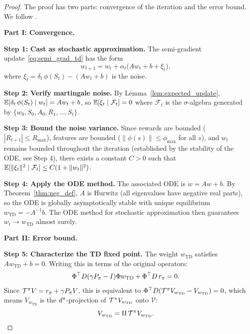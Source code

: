 \documentclass[11pt,a4paper]{article}
\begin{document}
\begin{proof}
The proof has two parts: convergence of the iteration and the error
bound. We follow \citet{tsitsiklis1997}.

\textbf{Part I: Convergence.}

\textbf{Step 1: Cast as stochastic approximation.}
The semi-gradient update~\eqref{eq:semi_grad_td} has the form
\begin{equation}
  w_{t+1} = w_t + \alpha_t\bigl(Aw_t + b + \xi_t\bigr),
  \label{eq:sa_form}
\end{equation}
where $\xi_t = \delta_t\,\phi(S_t) - (Aw_t + b)$ is the noise.

\textbf{Step 2: Verify martingale noise.}
By Lemma~\ref{lem:expected_update},
$\mathbb{E}[\delta_t\,\phi(S_t) \mid w_t] = Aw_t + b$, so
$\mathbb{E}[\xi_t \mid \mathcal{F}_t] = 0$ where $\mathcal{F}_t$ is the
$\sigma$-algebra generated by $\{w_0, S_0, A_0, R_1, \ldots, S_t\}$.

\textbf{Step 3: Bound the noise variance.}
Since rewards are bounded ($|R_{t+1}| \leq R_{\max}$), features are
bounded ($\|\phi(s)\| \leq \phi_{\max}$ for all $s$), and $w_t$
remains bounded throughout the iteration (established by the stability
of the ODE, see Step 4), there exists a constant $C > 0$ such that
$\mathbb{E}[\|\xi_t\|^2 \mid \mathcal{F}_t] \leq C(1 + \|w_t\|^2)$.

\textbf{Step 4: Apply the ODE method.}
The associated ODE is $\dot{w} = Aw + b$. By
Theorem~\ref{thm:neg_def}, $A$ is Hurwitz (all eigenvalues have
negative real parts), so the ODE is globally asymptotically stable with
unique equilibrium $w_{\mathrm{TD}} = -A^{-1}b$. The ODE method for
stochastic approximation \citep{borkar2008} then guarantees
$w_t \to w_{\mathrm{TD}}$ almost surely.

\textbf{Part II: Error bound.}

\textbf{Step 5: Characterize the TD fixed point.}
The weight $w_{\mathrm{TD}}$ satisfies $Aw_{\mathrm{TD}} + b = 0$.
Writing this in terms of the original operators:
\begin{equation}
  \Phi^\top D(\gamma P_\pi - I)\Phi w_{\mathrm{TD}}
  + \Phi^\top D\, r_\pi = 0.
  \label{eq:fixed_point_eq}
\end{equation}
Since $\mathcal{T}^\pi V = r_\pi + \gamma P_\pi V$, this
is equivalent to
$\Phi^\top D(\mathcal{T}^\pi V_{w_\mathrm{TD}} - V_{w_\mathrm{TD}}) = 0$,
which means $V_{w_\mathrm{TD}}$ is the $d^\pi$-projection of
$\mathcal{T}^\pi V_{w_\mathrm{TD}}$ onto $\mathcal{V}$:
\begin{equation}
  V_{w_\mathrm{TD}} = \Pi\,\mathcal{T}^\pi V_{w_\mathrm{TD}}.
  \label{eq:projected_bellman}
\end{equation}


\end{proof}
\end{document}
